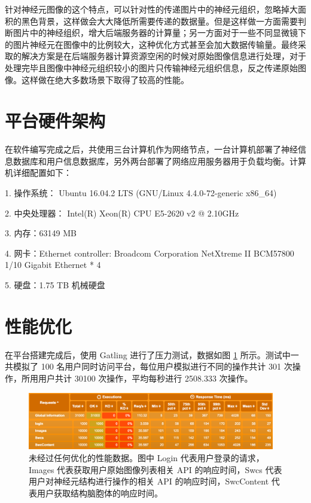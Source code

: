 针对神经元图像的这个特点，可以针对性的传递图片中的神经元组织，忽略掉大面积的黑色背景，这样做会大大降低所需要传递的数据量。但是这样做一方面需要判断图片中的神经组织，增大后端服务器的计算量；另一方面对于一些不同显微镜下的图片神经元在图像中的比例较大，这种优化方式甚至会加大数据传输量。最终采取的解决方案是在后端服务器计算资源空闲的时候对原始图像信息进行处理，对于处理完毕且图像中神经元组织较小的图片只传输神经元组织信息，反之传递原始图像。这样做在绝大多数场景下取得了较高的性能。

\section{平台硬件架构}
在软件编写完成之后，共使用三台计算机作为网络节点，一台计算机部署了神经信息数据库和用户信息数据库，另外两台部署了网络应用服务器用于负载均衡。计算机详细配置如下：

1. 操作系统： Ubuntu 16.04.2 LTS (GNU/Linux 4.4.0-72-generic x86\_64)

2. 中央处理器： Intel(R) Xeon(R) CPU E5-2620 v2 @ 2.10GHz

3. 内存：63149 MB

4. 网卡：Ethernet controller: Broadcom Corporation NetXtreme II BCM57800 1/10 Gigabit Ethernet * 4

5. 硬盘：1.75 TB 机械硬盘

\section{性能优化}

在平台搭建完成后，使用 Gatling 进行了压力测试，数据如图 \ref{origin} 所示。测试中一共模拟了 100 名用户同时访问平台，每位用户模拟进行不同的操作共计 301 次操作，所用用户共计 30100 次操作，平均每秒进行 2508.333 次操作。

\begin{figure}
\centering
\includegraphics[width=108mm]{images/origin}
\caption{未经过任何优化的性能数据。图中 Login 代表用户登录的请求， Images 代表获取用户原始图像列表相关 API 的响应时间，Swcs 代表用户对神经元结构进行操作的相关 API 的响应时间，SwcContent 代表用户获取结构脑胞体的响应时间。}
\label{origin}
\end{figure}

